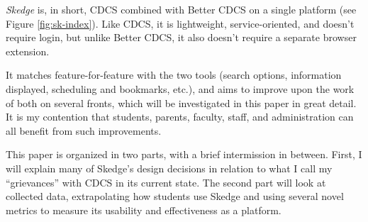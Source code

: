 \emph{Skedge} \cite{skedge} is, in short, CDCS combined with Better CDCS on a single platform (see Figure \ref{fig:sk-index}). Like CDCS, it is lightweight, service-oriented, and doesn't require login, but unlike Better CDCS, it also doesn't require a separate browser extension.

It matches feature-for-feature with the two tools (search options, information displayed, scheduling and bookmarks, etc.), and aims to improve upon the work of both on several fronts, which will be investigated in this paper in great detail. It is my contention that students, parents, faculty, staff, and administration can all benefit from such improvements.

\vspace{30pt}

\noindent
This paper is organized in two parts, with a brief intermission in between. First, I will explain many of Skedge's design decisions in relation to what I call my ``grievances'' with CDCS in its current state. The second part will look at collected data, extrapolating how students use Skedge and using several novel metrics to measure its usability and effectiveness as a platform.